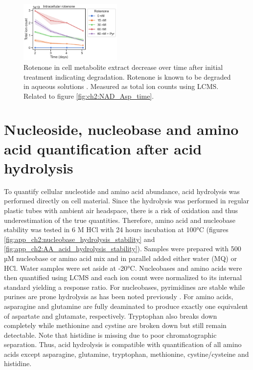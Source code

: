 \begin{figure}[ht]
    \centering
    \includegraphics[width=0.45\textwidth]{figures/chap2/app/intra-rotenone-time_rep1.pdf}
    \caption[Rotenone concentration over time.]{
    Rotenone in cell metabolite extract decrease over time after initial treatment indicating degradation.
    Rotenone is known to be degraded in aqueous solutions \cite{Rohan2015-co}.
    Measured as total ion counts using LCMS.
    Related to figure \ref{fig:ch2:NAD_Asp_time}.
    }
    \label{fig:ch2:app:Rot_by_day}
\end{figure}








\section{Nucleoside, nucleobase and amino acid quantification after acid hydrolysis}
\label{sec:ch2:app:quant}
To quantify cellular nucleotide and amino acid abundance, acid hydrolysis was performed directly on cell material.
Since the hydrolysis was performed in regular plastic tubes with ambient air headspace, there is a risk of oxidation and thus underestimation of the true quantities.
Therefore, amino acid and nucleobase stability was tested in 6 M HCl with 24 hours incubation at 100°C (figures \ref{fig:app_ch2:nucleobase_hydrolysis_stability} and \ref{fig:app_ch2:AA_acid_hydrolysis_stability}).
Samples were prepared with 500 µM nucleobase or amino acid mix and in parallel added either water (MQ) or HCl.
Water samples were set aside at -20°C.
Nucleobases and amino acids were then quantified using LCMS and each ion count were normalized to its internal standard yielding a response ratio.
For nucleobases, pyrimidines are stable while purines are prone hydrolysis as has been noted previously \cite{Strecker1861-mh, Wulff1892-og, Hunter1936-iu, Markham1949-qy}.
For amino acids, asparagine and glutamine are fully deaminated to produce exactly one equivalent of aspartate and glutamate, respectively.
Tryptophan also breaks down completely while methionine and cystine are broken down but still remain detectable.
Note that histidine is missing due to poor chromatographic separation.  
Thus, acid hydrolysis is compatible with quantification of all amino acids except asparagine, glutamine, tryptophan, methionine, cystine/cysteine and histidine.

